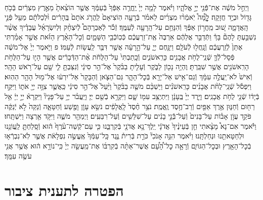 \documentclass[twoside, openany, parskip=half, 11pt]{book}
\begin{document}
\begin{sometimes}
\begin{footnotesize}
\begin{multicols}{2}
\\
וַיְחַ֣ל מֹשֶׁ֔ה אֶת־פְּֿֿנֵ֖י יְיָ֣ אֱלֹהָ֑יו וַיֹּ֗אמֶר לָמָ֤ה יְיָ֙ יֶֽחֱרֶ֤ה אַפְּֿךָ֙ בְּֿעַמֶּ֔ךָ אֲשֶׁ֤ר הוֹצֵ֨אתָ֙ מֵאֶ֣רֶץ מִצְרַ֔יִם בְּֿכֹ֥חַ גָּד֖וֹל וּבְיָ֥ד חֲזָקָֽה׃ לׇׇׇׇׇׇׇׇָ֩מָּה֩ יֹֽאמְֿר֨וּ מִצְרַ֜יִם לֵאמֹ֗ר בְּֿרָעָ֤ה הֽוֹצִיאָם֙ לַֽהֲרֹ֤ג אֹתָם֙ בֶּֽהָרִ֔ים וּ֨לְכַלֹּתָ֔ם מֵעַ֖ל פְּֿנֵ֣י הָֽאֲדָמָ֑ה שׁ֚וּב מֵֽחֲר֣וֹן אַפֶּ֔ךָ וְֿהִנָּחֵ֥ם עַל־הָֽרָעָ֖ה לְֿעַמֶּֽךָ׃ זְֿכֹ֡ר לְֿאַבְרָהָם֩ לְֿיִצְחָ֨ק וּֽלְיִשְׂרָאֵ֜ל עֲבָדֶ֗יךָ אֲשֶׁ֨ר נִשְׁבַּ֣עְתָּ לָהֶם֘ בָּךְ֒ וַתְּֿדַבֵּ֣ר אֲלֵהֶ֔ם אַרְבֶּה֙ אֶֽת־זַרְעֲכֶ֔ם כְּֿכֽוֹכְֿבֵ֖י הַשָּׁמָ֑יִם וְֿכׇל־הָאָ֨רֶץ הַזֹּ֜את אֲשֶׁ֣ר אָמַ֗רְתִּי אֶתֵּן֙ לְֿזַֽרְעֲכֶ֔ם וְֿנָֽחֲל֖וּ לְֿעֹלָֽם׃ וַיִּנָּ֖חֶם יְיָ֑ עַל־הָ֣רָעָ֔ה אֲשֶׁ֥ר דִּבֶּ֖ר לַֽעֲשׂ֥וֹת לְֿעַמּֽוֹ׃ פ
וַיֹּ֤אמֶר יְיָ֙ אֶל־מֹשֶׁ֔ה פְּֿסָל־לְֿֿךָ֛ שְֿׁנֵֽי־לֻחֹ֥ת אֲבָנִ֖ים כָּרִֽאשֹׁנִ֑ים וְֿכָֽתַבְתִּי֙ עַל־הַלֻּחֹ֔ת אֶ֨ת־הַדְּֿבָרִ֔ים אֲשֶׁ֥ר הָי֛וּ עַל־הַלֻּחֹ֥ת הָרִֽאשֹׁנִ֖ים אֲשֶׁ֥ר שִׁבַּֽרְתָּ׃ וֶהְיֵ֥ה נָכ֖וֹן לַבֹּ֑קֶר וְֿעָלִ֤יתָ בַבֹּ֨קֶר֙ אֶל־הַ֣ר סִינַ֔י וְֿנִצַּבְתָּ֥ לִ֛י שָׁ֖ם עַל־רֹ֥אשׁ הָהָֽר׃ וְֿאִישׁ֙ לֹא־יַֽעֲלֶ֣ה עִמָּ֔ךְ וְֿגַם־אִ֥ישׁ אַל־יֵרָ֖א בְּֿכׇל־הָהָ֑ר גַּם־הַצֹּ֤אן וְֿהַבָּקָר֙ אַל־יִרְע֔וּ אֶל־מ֖וּל הָהָ֥ר הַהֽוּא׃ 
וַיִּפְסֹ֡ל שְֿׁנֵֽי־לֻחֹ֨ת אֲבָנִ֜ים כָּרִֽאשֹׁנִ֗ים וַיַּשְׁכֵּ֨ם מֹשֶׁ֤ה בַבֹּ֨קֶר֙ וַיַּ֨עַל֙ אֶל־הַ֣ר סִינַ֔י כַּֽאֲשֶׁ֛ר צִוָּ֥ה יְיָ֖ אֹת֑וֹ וַיִּקַּ֣ח בְּֿיָד֔וֹ שְֿׁנֵ֖י לֻחֹ֥ת אֲבָנִֽים׃ וַיֵּ֤רֶד יְיָ֙ בֶּֽעָנָ֔ן וַיִּתְיַצֵּ֥ב עִמּ֖וֹ שָׁ֑ם וַיִּקְרָ֥א בְֿשֵׁ֖ם יְיָ׃ וַיַּֽעֲבֹ֨ר יְיָ֥ עַל־פָּנָיו֘ וַיִּקְרָא֒ יְיָ֣ יְיָ֔ אֵ֥ל רַח֖וּם וְֿחַנּ֑וּן אֶ֥רֶךְ אַפַּ֖יִם וְֿרַב־חֶ֥סֶד וֶֽאֱמֶֽת׃ נֹצֵ֥ר חֶ֨סֶד֙ לָֽאֲלָפִ֔ים נֹשֵׂ֥א עָוֹ֛ן וָפֶ֖שַׁע וְֿחַטָּאָ֑ה וְֿנַקֵּה֙ לֹ֣א יְֿנַקֶּ֔ה פֹּקֵ֣ד עֲוֹ֣ן אָב֗וֹת עַל־בָּנִים֙ וְֿעַל־בְּֿֿנֵ֣י בָנִ֔ים עַל־שִׁלֵּשִׁ֖ים וְֿעַל־רִבֵּעִֽים׃ וַיְמַהֵ֖ר מֹשֶׁ֑ה וַיִּקֹּ֥ד אַ֖רְצָה וַיִּשְׁתָּֽחוּ׃ וַיֹּ֡אמֶר אִם־נָא֩ מָצָ֨אתִי חֵ֤ן בְּֿעֵינֶ֨יךָ֙ אֲדֹנָ֔י יֵֽלֶךְ־נָ֥א אֲדֹנָ֖י בְּֿקִרְבֵּ֑נוּ כִּ֤י עַם־קְֿשֵׁה־עֹ֨רֶף֙ ה֔וּא וְֿסָֽלַחְתָּ֛ לַֽעֲוֹנֵ֥נוּ וּלְחַטָּאתֵ֖נוּ וּנְחַלְתָּֽנוּ׃ וַיֹּ֗אמֶר הִנֵּ֣ה אָנֹכִי֘ כֹּרֵ֣ת בְּֿרִית֒ נֶ֤גֶד כָּֽל־עַמְּֿךָ֙ אֶֽעֱשֶׂ֣ה נִפְלָאֹ֔ת אֲשֶׁ֛ר לֹֽא־נִבְרְֿא֥וּ בְֿכׇל־הָאָ֖רֶץ וּבְכׇל־הַגּוֹיִ֑ם וְֿרָאָ֣ה כׇל־הָ֠עָ֠ם אֲשֶׁר־אַתָּ֨ה בְֿקִרְבּ֜וֹ אֶת־מַֽעֲשֵׂ֤ה יְיָ֙ כִּֽי־נוֹרָ֣א ה֔וּא אֲשֶׁ֥ר אֲנִ֖י עֹשֶׂ֥ה עִמָּֽךְ׃

\end{multicols}

\section*{הפטרה לתענית ציבור}



\end{footnotesize}
\end{sometimes}
\end{document}
